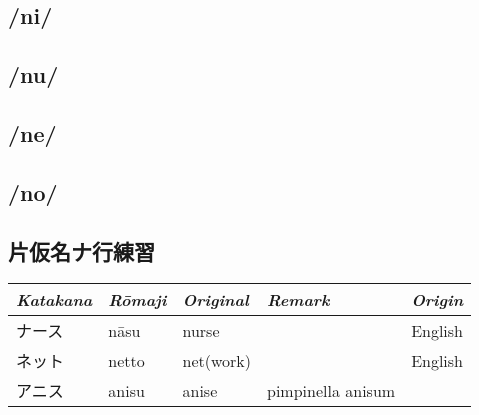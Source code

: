 \subsection{/ni/} \label{sec:KatakanaNi}

 

\subsection{/nu/} \label{sec:KatakanaNu}

 

\subsection{/ne/} \label{sec:KatakanaNe}

 

\subsection{/no/} \label{sec:KatakanaNo}

 

\subsection{片仮名ナ行練習}
\Padding
\begin{longtable}[c]{p{2cm}p{2cm}p{3cm}p{6cm}p{2cm}}
\textit{Katakana}&\textit{Rōmaji}&\textit{Original}&\textit{Remark}&\textit{Origin}\\\hline
ナース  &nāsu &nurse      &                                        &English\\
ネット  &netto&net(work)  &                                        &English\\
アニス　&anisu&anise      &pimpinella anisum                       &\\
\end{longtable}

